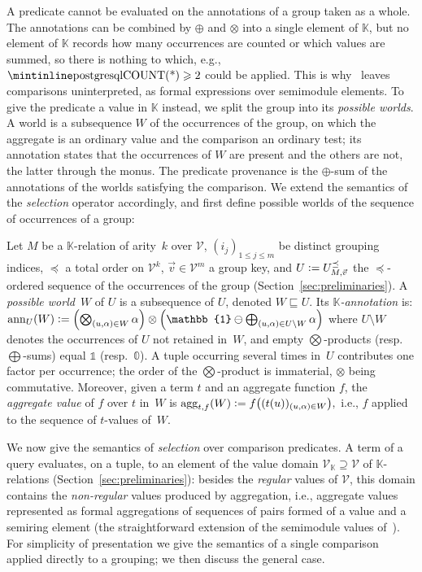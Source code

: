 A  predicate cannot be evaluated on the annotations of a
group taken as a whole. The annotations can be combined by $\oplus$ and $\otimes$
into a single element of $\mathbb K$, but no element of $\mathbb K$
records how many occurrences are counted or which values are summed, so
there is nothing to which, e.g., $\text{\sql{COUNT(*)}}\geq 2$ could be applied. This
is why~\cite{amsterdamer2011provenance} leaves comparisons
uninterpreted, as formal expressions over semimodule elements. To give the predicate
a value in $\mathbb K$ instead, we split the group into its
\emph{possible worlds}. A world is a subsequence $W$ of the occurrences of
the group, on which the aggregate is an ordinary value and the comparison
an ordinary test; its annotation states that the occurrences of $W$ are
present and the others are not, the latter through the monus. The
predicate provenance is the $\oplus$-sum of the annotations of the worlds
satisfying the comparison.
We extend the semantics of the \emph{selection} operator accordingly, and
first define possible worlds of the sequence of occurrences of a group:
\begin{definition}\label{def:possible_world}
  Let $M$ be a $\mathbb K$-relation of arity~$k$ over $\mathcal V$,
  $(i_j)_{1\leq j \leq m}$ be distinct grouping indices, $\preceq$ a
  total order on $\mathcal{V}^k$, $\vec v\in\mathcal V^m$ a group key,
  and $U\mathrel{\mathop:}= U^{\preceq}_{M,\vec v}$ the $\preceq$-ordered sequence of
  the occurrences of the group (Section~\ref{sec:preliminaries}).
  A \emph{possible world}~$W$ of $U$ is a subsequence
  of $U$, denoted $W\sqsubseteq U$. Its \emph{$\mathbb{K}$-annotation} is:
\(
\ann_U(W) \defeq
\Bigl( \bigotimes_{(u,\alpha)\in W} \alpha\Bigr)
 \otimes
\Bigl( \mathbb{1} \ominus \bigoplus_{(u,\alpha)\in U\setminus W}
  \alpha\Bigr)
\)
where $U\setminus W$ denotes the occurrences of $U$ not retained
in~$W$, and empty $\bigotimes$-products (resp.\ $\bigoplus$-sums) equal
$\mathbb{1}$ (resp.\ $\mathbb{0}$). A tuple occurring several times
in~$U$ contributes one factor per occurrence; the order of the
$\bigotimes$-product is immaterial, $\otimes$ being commutative.
Moreover, given a term $t$ and an aggregate function $f$, the
\emph{aggregate value} of $f$ over $t$ in~$W$ is
\(
\mathrm{agg}_{t,f}(W)\mathrel{\mathop:}= f\bigl((t(u))_{(u,\alpha)\in W}\bigr),
\)
i.e., $f$ applied to the sequence of $t$-values of~$W$.
\end{definition}

We now give the semantics of \emph{selection} over comparison predicates.
A term of a query evaluates, on a tuple, to an element of the value
domain $\mathcal V_{\mathbb K}\supseteq\mathcal V$ of $\mathbb
K$-relations (Section~\ref{sec:preliminaries}): besides the
\emph{regular} values of $\mathcal V$, this domain contains the
\emph{non-regular} values produced by aggregation, i.e., aggregate values
represented as formal aggregations of sequences of pairs formed of a
value and a semiring element (the straightforward extension of the
semimodule values of~\cite{amsterdamer2011provenance}). For simplicity
of presentation we give
the semantics of a single comparison applied directly to a grouping; we
then discuss the
general case.

